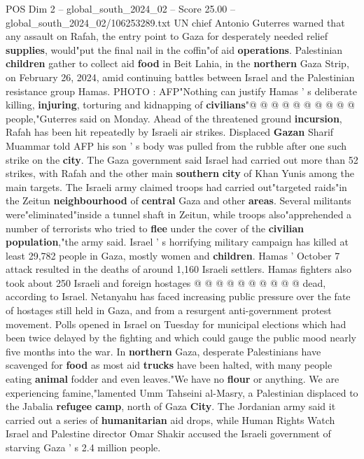\begin{textsample}{POS Dim 2 – global\_south\_2024\_02 – Score 25.00 – global\_south\_2024\_02/106253289.txt}
UN chief Antonio Guterres warned that any assault on Rafah, the entry point to Gaza for desperately needed relief \textbf{supplies}, would"put the final nail in the coffin"of aid \textbf{operations}.
Palestinian \textbf{children} gather to collect aid \textbf{food} in Beit Lahia, in the \textbf{northern} Gaza Strip, on February 26, 2024, amid continuing battles between Israel and the Palestinian resistance group Hamas.
PHOTO : AFP"Nothing can justify Hamas ' s deliberate killing, \textbf{injuring}, torturing and kidnapping of \textbf{civilians}"@ @ @ @ @ @ @ @ @ @ people,"Guterres said on Monday.
Ahead of the threatened ground \textbf{incursion}, Rafah has been hit repeatedly by Israeli air strikes.
Displaced \textbf{Gazan} Sharif Muammar told AFP his son ' s body was pulled from the rubble after one such strike on the \textbf{city}.
The Gaza government said Israel had carried out more than 52 strikes, with Rafah and the other main \textbf{southern} \textbf{city} of Khan Yunis among the main targets.
The Israeli army claimed troops had carried out"targeted raids"in the Zeitun \textbf{neighbourhood} of \textbf{central} Gaza and other \textbf{areas}.
Several militants were"eliminated"inside a tunnel shaft in Zeitun, while troops also"apprehended a number of terrorists who tried to \textbf{flee} under the cover of the \textbf{civilian} \textbf{population},"the army said.
Israel ' s horrifying military campaign has killed at least 29,782 people in Gaza, mostly women and \textbf{children}.
Hamas ' October 7 attack resulted in the deaths of around 1,160 Israeli settlers.
Hamas fighters also took about 250 Israeli and foreign hostages @ @ @ @ @ @ @ @ @ @ dead, according to Israel.
Netanyahu has faced increasing public pressure over the fate of hostages still held in Gaza, and from a resurgent anti-government protest movement.
Polls opened in Israel on Tuesday for municipal elections which had been twice delayed by the fighting and which could gauge the public mood nearly five months into the war.
In \textbf{northern} Gaza, desperate Palestinians have scavenged for \textbf{food} as most aid \textbf{trucks} have been halted, with many people eating \textbf{animal} fodder and even leaves."We have no \textbf{flour} or anything.
We are experiencing famine,"lamented Umm Tahseini al-Masry, a Palestinian displaced to the Jabalia \textbf{refugee} \textbf{camp}, north of Gaza \textbf{City}.
The Jordanian army said it carried out a series of \textbf{humanitarian} aid drops, while Human Rights Watch Israel and Palestine director Omar Shakir accused the Israeli government of starving Gaza ' s 2.4 million people.

\end{textsample}
